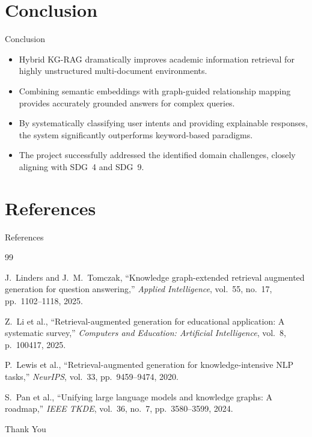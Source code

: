 \documentclass[10pt,aspectratio=1610]{beamer}
\begin{document}
\section{Conclusion}
\begin{frame}{Conclusion}
\begin{itemize}
\item Hybrid KG-RAG dramatically improves academic information retrieval for highly unstructured multi-document environments.
\item Combining semantic embeddings with graph-guided relationship mapping provides accurately grounded answers for complex queries.
\item By systematically classifying user intents and providing explainable responses, the system significantly outperforms keyword-based paradigms.
\item The project successfully addressed the identified domain challenges, closely aligning with SDG~4 and SDG~9.
\end{itemize}
\end{frame}

\section{References}
\begin{frame}{References}
\scriptsize

\begin{thebibliography}{99}

J.~Linders and J.~M.~Tomczak,
``Knowledge graph-extended retrieval augmented generation for question answering,''
\emph{Applied Intelligence}, vol.~55, no.~17, pp.~1102--1118, 2025.

Z.~Li et al.,
``Retrieval-augmented generation for educational application: A systematic survey,''
\emph{Computers and Education: Artificial Intelligence}, vol.~8, p.~100417, 2025.

P.~Lewis et al.,
``Retrieval-augmented generation for knowledge-intensive NLP tasks,''
\emph{NeurIPS}, vol.~33, pp.~9459--9474, 2020.

S.~Pan et al.,
``Unifying large language models and knowledge graphs: A roadmap,''
\emph{IEEE TKDE}, vol.~36, no.~7, pp.~3580--3599, 2024.

\end{thebibliography}
\end{frame}

\begin{frame}
\centering
\Huge \textcolor{myNewColorA}{Thank You}
\end{frame}
\end{document}
